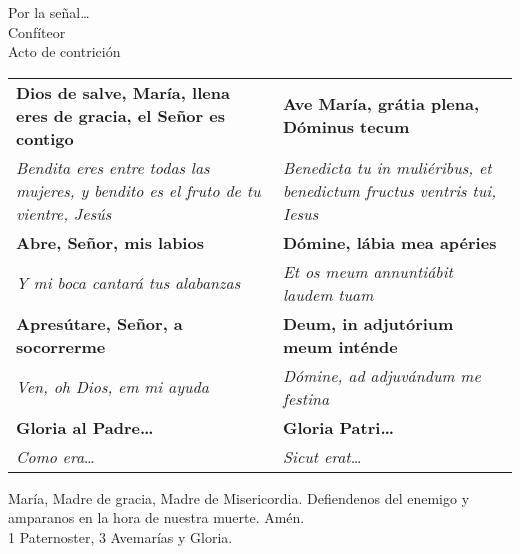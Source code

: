 \documentclass[./devocionario.tex]{subfiles}
\begin{document}
    \begin{center}
        Por la señal{\ldots}\\
        Confíteor\\
        Acto de contrición
    \end{center}

    \begin{longtable} { p{} p{} }
        \textbf{Dios de salve, María, llena eres de gracia, el Señor es contigo} & \textbf{Ave María, grátia plena, Dóminus tecum}\\
        \textit{Bendita eres entre todas las mujeres, y bendito es el fruto de tu vientre, Jesús} & 
        \textit{Benedicta tu in muliéribus, et benedictum fructus ventris tui, Iesus}\\
        \textbf{Abre, Señor, mis labios} & \textbf{Dómine, lábia mea apéries}\\
        \textit{Y mi boca cantará tus alabanzas} & \textit{Et os meum annuntiábit laudem tuam}\\
        \textbf{Apresútare, Señor, a socorrerme} & \textbf{Deum, in adjutórium meum inténde}\\
        \textit{Ven, oh Dios, em mi ayuda} & \textit{Dómine, ad adjuvándum me festina}\\ 
        \textbf{Gloria al Padre{\ldots}} & \textbf{Gloria Patri{\ldots}}\\
        \textit{Como era}{\ldots} & \textit{Sicut erat}{\ldots}\\
    \end{longtable}

    \begin{center}
        María, Madre de gracia, Madre de Misericordia. Defiendenos del enemigo y amparanos en la hora de nuestra muerte. Amén.\\
        1 Paternoster, 3 Avemarías y Gloria.
    \end{center}
\end{document}
